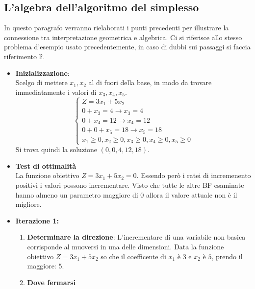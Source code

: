 \documentclass{article}
\newcommand*\circled[1]{\tikz[baseline=(char.base)]{
            \node[shape=circle,draw,inner sep=1pt] (char) {#1};}}
\begin{document}
\subsection{L'algebra dell'algoritmo del simplesso}
In questo paragrafo verranno rielaborati i punti precedenti per illustrare la connessione tra interpretazione geometrica e algebrica. Ci si riferisce allo stesso problema d'esempio usato precedentemente, in caso di dubbi sui passaggi si faccia riferimento lì.
\begin{tcolorbox}[
    colback=lightgray,
    colframe=black,
    coltext=black,
    title=Algebra dell'esempio del simplesso,
    colbacktitle=black,
    coltitle=lightgray,
    breakable
  ]
  \begin{itemize}
    \item \textbf{Inizializzazione}: \\
          Scelgo di mettere $x_1, x_2$ al di fuori della base, in modo da trovare immediatamente i valori di $x_3, x_4, x_5$.
          $$
            \begin{cases}
              Z = 3x_1 + 5x_2           \\
              0+x_3 =  4 \to x_3=4      \\
              0 +x_4 =  12 \to x_4 = 12 \\
              0+0+x_5 = 18 \to x_5 = 18 \\
              x_1 \ge 0,
              x_2 \ge 0,
              x_3 \ge 0,
              x_4 \ge 0,
              x_5 \ge 0
            \end{cases}
          $$
          Si trova quindi la soluzione $(0,0,4,12,18)$.
    \item \circled{1}\textbf{Test di ottimalità} \\
          La funzione obiettivo $Z=3x_1+5x_2=0$. Essendo però i ratei di incremenento positivi i valori possono incrementare. Visto che tutte le altre BF esaminate hanno almeno un parametro maggiore di $0$ allora il valore attuale non è il migliore.
    \item \textbf{Iterazione 1:}
          \begin{enumerate}
            \item \textbf{Determinare la direzione}:
                  L'incrementare di una variabile non basica corrisponde al muoversi in una delle dimensioni. Data la funzione obiettivo $Z=3x_1+5x_2$ so che il coefficente di $x_1$ è $3$ e $x_2$ è $5$, prendo il maggiore: $5$.
            \item \textbf{Dove fermarsi} \\

\end{enumerate}
\end{itemize}
\end{tcolorbox}
\end{document}

